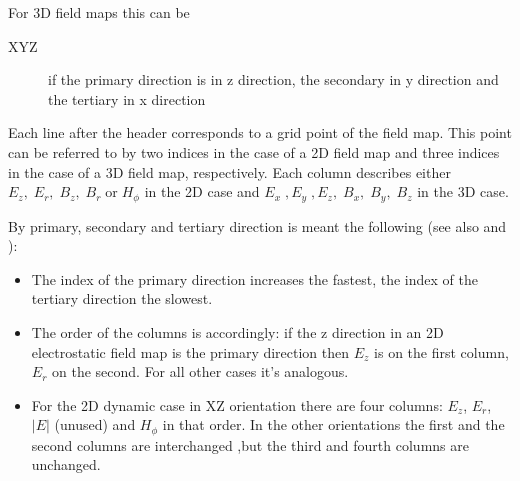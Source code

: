 For 3D field maps this can be
\begin{description}
\item[XYZ]\Newline
if the primary direction is in z direction, the secondary in y direction and the tertiary in x direction
\end{description}

Each line after the header corresponds to a grid point of the field map. This point can be referred to by two indices in
the case of a 2D field map and three indices in the case of a 3D field map, respectively. Each column describes either
$E_z,\; E_r,\; B_z,\; B_r\; \text{or}\;H_{\phi}$ in the 2D case and $E_x\;, E_y\;, E_z,\; B_x,\; B_y,\;B_z$ in the 3D case.

By primary, secondary and tertiary direction is meant the following (see also  and ):
\begin{itemize}
\item
The index of the primary direction increases the fastest, the index of the tertiary direction the slowest.
\item
The order of the columns is accordingly: if the z direction in an 2D electrostatic field map is the primary direction then $E_z$ is
on the first column, $E_r$ on the second. For all other cases it's analogous.
\item
For the 2D dynamic case in XZ orientation there are four columns: $E_z$, $E_r$, $|E|$ (unused) and $H_{\phi}$ in that order.
In the other orientations the first and the second columns are interchanged ,but the third and fourth columns are unchanged.
\end{itemize}

